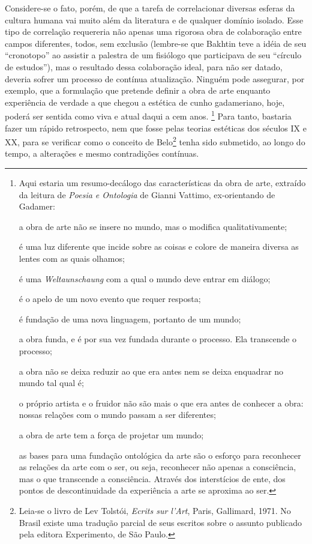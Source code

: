 Considere-se o fato, porém, de que a tarefa de correlacionar diversas
esferas da cultura humana vai muito além da literatura e de qualquer
domínio isolado. Esse tipo de correlação requereria não apenas uma
rigorosa obra de colaboração entre campos diferentes, todos, sem
exclusão (lembre-se que Bakhtin teve a idéia de seu ``cronotopo'' ao
assistir a palestra de um fisiólogo que participava de seu ``círculo de
estudos''), mas o resultado dessa colaboração ideal, para não ser
datado, deveria sofrer um processo de contínua atualização. Ninguém pode
assegurar, por exemplo, que a formulação que pretende definir a obra de
arte enquanto experiência de verdade a que chegou a estética de cunho
gadameriano, hoje, poderá ser sentida como viva e atual daqui a cem
anos. \footnote{Aqui estaria um resumo-decálogo das características da
  obra de arte, extraído da leitura de \emph{Poesia e Ontologia} de
  Gianni Vattimo, ex-orientando de Gadamer:

  a obra de arte não se insere no mundo, mas o modifica
  qualitativamente;

  é uma luz diferente que incide sobre as coisas e colore de maneira
  diversa as lentes com as quais olhamos;

  é uma \emph{Weltaunschaung} com a qual o mundo deve entrar em diálogo;

  é o apelo de um novo evento que requer resposta;

  é fundação de uma nova linguagem, portanto de um mundo;

  a obra funda, e é por sua vez fundada durante o processo. Ela
  transcende o processo;

  a obra não se deixa reduzir ao que era antes nem se deixa enquadrar no
  mundo tal qual é;

  o próprio artista e o fruidor não são mais o que era antes de conhecer
  a obra: nossas relações com o mundo passam a ser diferentes;

  a obra de arte tem a força de projetar um mundo;

  as bases para uma fundação ontológica da arte são o esforço para
  reconhecer as relações da arte com o ser, ou seja, reconhecer não
  apenas a consciência, mas o que transcende a consciência. Através dos
  interstícios de ente, dos pontos de descontinuidade da experiência a
  arte se aproxima ao ser.} Para tanto, bastaria fazer um rápido
retrospecto, nem que fosse pelas teorias estéticas dos séculos IX e XX,
para se verificar como o conceito de Belo\footnote{Leia-se o livro de
  Lev Tolstói, \emph{Ecrits sur l'Art}, Paris, Gallimard, 1971. No
  Brasil existe uma tradução parcial de seus escritos sobre o assunto
  publicado pela editora Experimento, de São Paulo.} tenha sido
submetido, ao longo do tempo, a alterações e mesmo contradições
contínuas.

